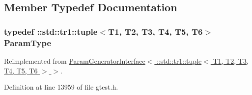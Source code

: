 \subsection{\-Member \-Typedef \-Documentation}
\hypertarget{classtesting_1_1internal_1_1CartesianProductGenerator6_a2f46503012c4ef785ad3fe03defbc7e1}{
\subsubsection[{\-Param\-Type}]{\setlength{\rightskip}{0pt plus 5cm}typedef \-::{\bf std\-::tr1\-::tuple}$<$\-T1, \-T2, \-T3, \-T4, \-T5, \-T6$>$ {\bf \-Param\-Type}}}\label{d3/d9a/classtesting_1_1internal_1_1CartesianProductGenerator6_a2f46503012c4ef785ad3fe03defbc7e1}


\-Reimplemented from \hyperlink{classtesting_1_1internal_1_1ParamGeneratorInterface_a1c17d95e5946c3f940ece2bd9165fc34}{\-Param\-Generator\-Interface$<$ \-::std\-::tr1\-::tuple$<$ T1, T2, T3, T4, T5, T6 $>$ $>$}.



\-Definition at line 13959 of file gtest.\-h.



